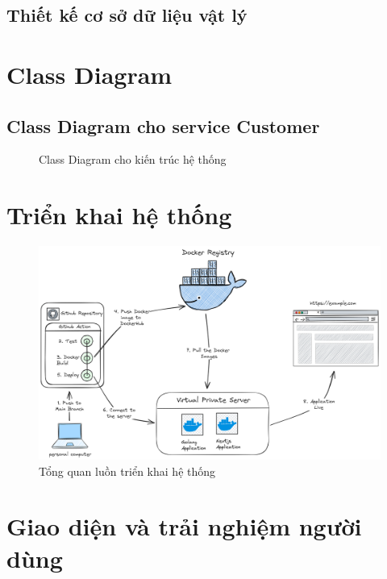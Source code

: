\newpage
\subsection{Thiết kế cơ sở dữ liệu vật lý}
\newpage
\section{Class Diagram}
\subsection{Class Diagram cho service Customer}
\begin{figure}[h]
    \centering
    \vspace{0.6cm}
    \caption{Class Diagram cho kiến trúc hệ thống}
    \label{fig:taskAssignment}
\end{figure}

\newpage
\section{Triển khai hệ thống}
\begin{figure}[h]
    \centering
    \includegraphics[scale = 0.17]{img/workflow.png}
    \vspace{1cm}
    \caption{Tổng quan luồn triển khai hệ thống}
    \label{fig:taskAssignment}
\end{figure}
\section{Giao diện và trải nghiệm người dùng}